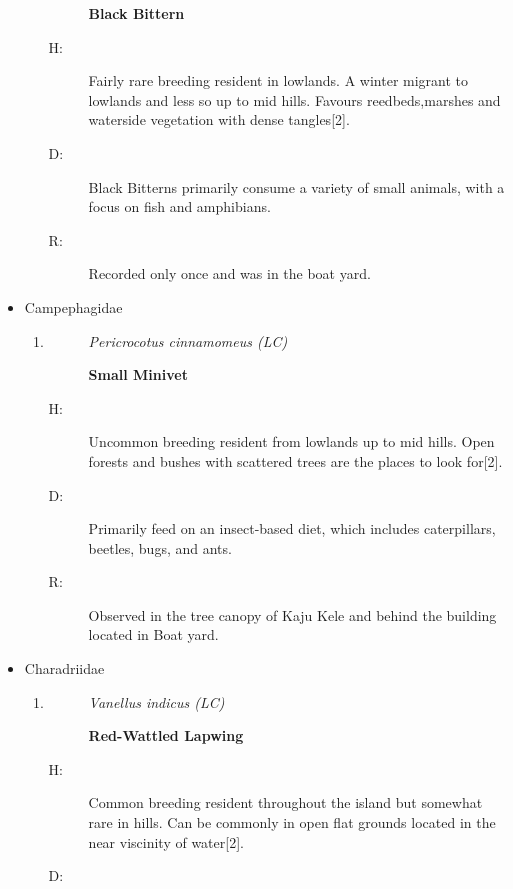 \begin{itemize}
\begin{enumerate}
\begin{description}
\textbf{Black Bittern}%
\end{description}%
\begin{description}%
\item[H: ]%
Fairly rare breeding resident in lowlands. A winter migrant to lowlands and less so up to mid hills. Favours reedbeds,marshes and waterside vegetation with dense tangles{[}2{]}.%
\item[D: ]%
Black Bitterns primarily consume a variety of small animals, with a focus on fish and amphibians.%
\item[R: ]%
Recorded only once and was in the boat yard.%
\end{description}%
\end{enumerate}%
\item%
Campephagidae%
\begin{enumerate}%
\item%
\begin{description}%
\item[]%
\textit{Pericrocotus cinnamomeus (LC)}%
\item[]%
\textbf{Small Minivet}%
\end{description}%
\begin{description}%
\item[H: ]%
Uncommon breeding resident from lowlands up to mid hills. Open forests and bushes with scattered trees are the places to look for{[}2{]}.%
\item[D: ]%
Primarily feed on an insect{-}based diet, which includes caterpillars, beetles, bugs, and ants.%
\item[R: ]%
Observed in the tree canopy of Kaju Kele and behind the building located in Boat yard.%
\end{description}%
\end{enumerate}%
\item%
Charadriidae%
\begin{enumerate}%
\item%
\begin{description}%
\item[]%
\textit{Vanellus indicus (LC)}%
\item[]%
\textbf{Red{-}Wattled Lapwing}%
\end{description}%
\begin{description}%
\item[H: ]%
Common breeding resident throughout the island but somewhat rare in hills. Can be commonly in open flat grounds located in the near viscinity of water{[}2{]}.%
\item[D: ]%

\end{description}
\end{enumerate}
\end{itemize}
